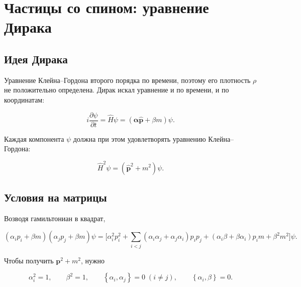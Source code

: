 \documentclass[../final.tex]{subfiles}
\begin{document}
\section{Частицы со спином: уравнение Дирака}

\subsection{Идея Дирака}

Уравнение Клейна--Гордона второго порядка по времени, поэтому
его плотность $\rho$ не положительно определена. Дирак искал
уравнение  и по времени,
и по координатам:

\begin{equation*}
    i\frac{\partial\psi}{\partial t}
    =
    \hat H\psi
    =
    \left(\boldsymbol\alpha\hat{\mathbf p}+\beta m\right)\psi.
\end{equation*}

Каждая компонента $\psi$ должна при этом удовлетворять
уравнению Клейна--Гордона:

\begin{equation*}
    \hat H^2\psi
    =
    \left(\hat{\mathbf p}^2+m^2\right)\psi.
\end{equation*}


\subsection{Условия на матрицы}

Возводя гамильтониан в квадрат,

\begin{equation*}
    \left(\alpha_ip_i+\beta m\right)
    \left(\alpha_jp_j+\beta m\right)\psi
    =
    \Big[
        \alpha_i^2p_i^2
        +\sum_{i<j}\left(\alpha_i\alpha_j+\alpha_j\alpha_i\right)p_ip_j
        +\left(\alpha_i\beta+\beta\alpha_i\right)p_im
        +\beta^2m^2
    \Big]\psi.
\end{equation*}

Чтобы получить $\mathbf p^2+m^2$, нужно

\begin{equation*}
    \alpha_i^2=1,
    \qquad
    \beta^2=1,
    \qquad
    \left\{\alpha_i,\alpha_j\right\}=0\;(i\neq j),
    \qquad
    \left\{\alpha_i,\beta\right\}=0.
\end{equation*}
\end{document}
